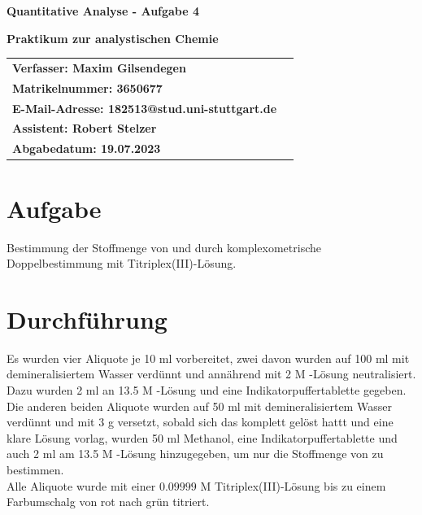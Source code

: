 \documentclass[12pt]{scrartcl} %
\begin{document}
\begin{titlepage}
\begin{center}
\vspace*{2cm}
\begin{LARGE}
\vspace*{1cm}
\textbf{\textsf{Quantitative Analyse - Aufgabe 4\\}}
\end{LARGE}
\vspace*{1cm}
\textbf{\textsf{Praktikum zur analystischen Chemie}}\\
\vspace*{1.5cm}
\begin{table}[H]
\sffamily
\hspace*{3cm}\begin{tabular}{>{\bfseries}l>{\bfseries}l}
Verfasser: Maxim Gilsendegen\\
Matrikelnummer: 3650677\\
E-Mail-Adresse: 182513@stud.uni-stuttgart.de\\
Assistent: Robert Stelzer\\
Abgabedatum: 19.07.2023\\
\end{tabular}
\end{table}
\end{center}
\end{titlepage}
\renewcommand{\thepage}{\Roman{page}}\setcounter{page}{1}
\tableofcontents %
\newpage
\renewcommand{\thepage}{\arabic{page}}\setcounter{page}{1}

\section{Aufgabe}
Bestimmung der Stoffmenge von  und  durch komplexometrische Doppelbestimmung mit Titriplex(III)-Lösung.\\

\section{Durchführung}
Es wurden vier Aliquote je 10 ml vorbereitet, zwei davon wurden auf 100 ml mit demineralisiertem Wasser verdünnt und annährend mit 2 M -Lösung neutralisiert. Dazu wurden 2 ml an 13.5 M -Lösung und eine Indikatorpuffertablette gegeben.\\
Die anderen beiden Aliquote wurden auf 50 ml mit demineralisiertem Wasser verdünnt und mit 3 g  versetzt, sobald sich das  komplett gelöst hattt und eine klare Lösung vorlag, wurden 50 ml Methanol, eine Indikatorpuffertablette und auch 2 ml am 13.5 M -Lösung hinzugegeben, um nur die Stoffmenge von  zu bestimmen.\\
Alle Aliquote wurde mit einer $0.09999$ M Titriplex(III)-Lösung bis zu einem Farbumschalg von rot nach grün titriert.
\end{document}
